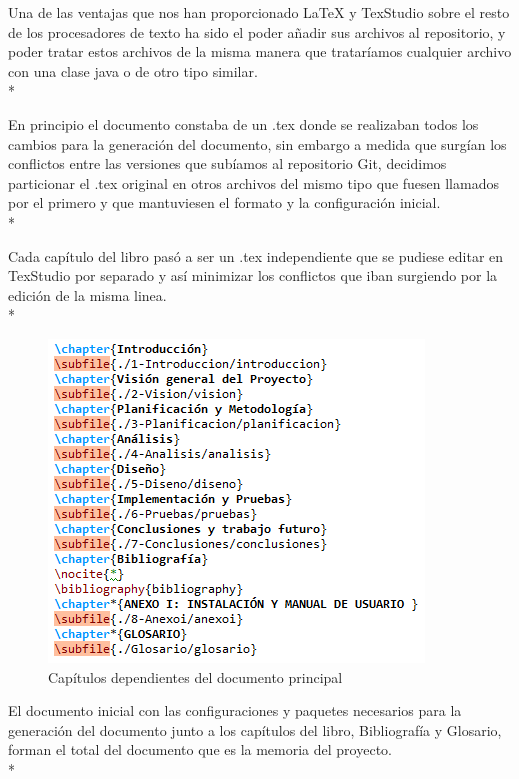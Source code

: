 \documentclass[../pfc.tex]{subfiles}
\begin{document}
	Una de las ventajas que nos han proporcionado LaTeX y TexStudio sobre el resto de los procesadores de texto ha sido el poder añadir sus archivos al repositorio, y poder tratar estos archivos de la misma manera que trataríamos cualquier archivo con una clase java o de otro tipo similar.\\*
	
	En principio el documento constaba de un .tex donde se realizaban todos los cambios para la generación del documento, sin embargo a medida que surgían los conflictos entre las versiones que subíamos al repositorio Git, decidimos particionar el .tex original en otros archivos del mismo tipo que fuesen llamados por el primero y que mantuviesen el formato y la configuración inicial.\\*
	
	Cada capítulo del libro pasó a ser un .tex independiente que se pudiese editar en TexStudio por separado y así minimizar los conflictos que iban surgiendo por la edición de la misma linea.\\*
	
	\begin{figure}[H]
		\centering
		\includegraphics[width=0.5\linewidth]{../images/texstudiochapters}
		\caption{Capítulos dependientes del documento principal}
		\label{fig:texstudioCHAP}
	\end{figure}
	
	El documento inicial con las configuraciones y paquetes necesarios para la generación del documento junto a los capítulos del libro, Bibliografía y Glosario, forman el total del documento que es la memoria del proyecto.\\*
	
	

	
\end{document}
